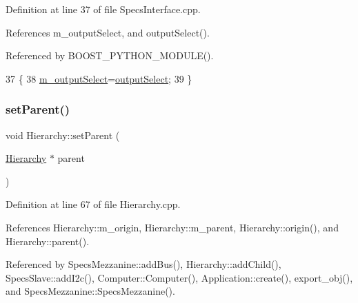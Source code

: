 Definition at line 37 of file Specs\+Interface.\+cpp.



References m\+\_\+output\+Select, and output\+Select().



Referenced by B\+O\+O\+S\+T\+\_\+\+P\+Y\+T\+H\+O\+N\+\_\+\+M\+O\+D\+U\+L\+E().


\begin{DoxyCode}
37                                                               \{
38     \hyperlink{classSpecsInterface_a660cb4112ce1c071f277cb6ec115b411}{m\_outputSelect}=\hyperlink{classSpecsInterface_ab291ed03f4c2f0143e14c26ad5f648dd}{outputSelect};
39 \}
\end{DoxyCode}
\mbox{\label{classHierarchy_a585ad1aeec16077a0e532ab8b4fc557b}} 
\subsubsection{\texorpdfstring{set\+Parent()}{setParent()}}
{\footnotesize\ttfamily void Hierarchy\+::set\+Parent (\begin{DoxyParamCaption}\item[{\hyperlink{classHierarchy}{Hierarchy} $\ast$}]{parent }\end{DoxyParamCaption})\hspace{0.3cm}{\ttfamily [inherited]}}



Definition at line 67 of file Hierarchy.\+cpp.



References Hierarchy\+::m\+\_\+origin, Hierarchy\+::m\+\_\+parent, Hierarchy\+::origin(), and Hierarchy\+::parent().



Referenced by Specs\+Mezzanine\+::add\+Bus(), Hierarchy\+::add\+Child(), Specs\+Slave\+::add\+I2c(), Computer\+::\+Computer(), Application\+::create(), export\+\_\+obj(), and Specs\+Mezzanine\+::\+Specs\+Mezzanine().


